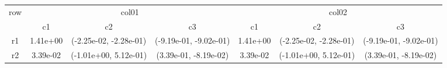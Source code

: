 \begin{tabular}{ccccccc}
\toprule
\multirow{2}{*}{row}&\multicolumn{3}{c}{col01}&\multicolumn{3}{c}{col02}\tabularnewline
\cmidrule(lr){2-4}
\cmidrule(lr){5-7}
&c1&c2&c3&c1&c2&c3\tabularnewline
\midrule
r1&1.41e+00& (-2.25e-02, -2.28e-01)& (-9.19e-01, -9.02e-01)&1.41e+00& (-2.25e-02, -2.28e-01)& (-9.19e-01, -9.02e-01)\tabularnewline
r2&3.39e-02& (-1.01e+00, 5.12e-01)& (3.39e-01, -8.19e-02)&3.39e-02& (-1.01e+00, 5.12e-01)& (3.39e-01, -8.19e-02)\tabularnewline
\bottomrule
\end{tabular}
